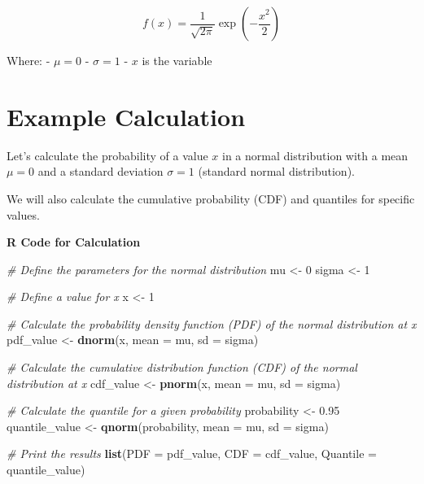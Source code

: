 \documentclass[
]{book}
\newenvironment{Shaded}{\begin{snugshade}}{\end{snugshade}}
\newcommand{\AttributeTok}[1]{\textcolor[rgb]{0.13,0.29,0.53}{#1}}
\newcommand{\CommentTok}[1]{\textcolor[rgb]{0.56,0.35,0.01}{\textit{#1}}}
\newcommand{\DecValTok}[1]{\textcolor[rgb]{0.00,0.00,0.81}{#1}}
\newcommand{\FloatTok}[1]{\textcolor[rgb]{0.00,0.00,0.81}{#1}}
\newcommand{\FunctionTok}[1]{\textcolor[rgb]{0.13,0.29,0.53}{\textbf{#1}}}
\newcommand{\NormalTok}[1]{#1}
\newcommand{\OtherTok}[1]{\textcolor[rgb]{0.56,0.35,0.01}{#1}}
\begin{document}
\[
f(x) = \frac{1}{\sqrt{2\pi}} \exp\left(-\frac{x^2}{2}\right)
\]

Where:
- \(\mu = 0\)
- \(\sigma = 1\)
- \(x\) is the variable

\hypertarget{example-calculation-1}{%
\section{Example Calculation}\label{example-calculation-1}}

Let's calculate the probability of a value \(x\) in a normal distribution with a mean \(\mu = 0\) and a standard deviation \(\sigma = 1\) (standard normal distribution).

We will also calculate the cumulative probability (CDF) and quantiles for specific values.

\textbf{R Code for Calculation}

\begin{Shaded}
\begin{Highlighting}[]
\CommentTok{\# Define the parameters for the normal distribution}
\NormalTok{mu }\OtherTok{\textless{}{-}} \DecValTok{0}
\NormalTok{sigma }\OtherTok{\textless{}{-}} \DecValTok{1}

\CommentTok{\# Define a value for x}
\NormalTok{x }\OtherTok{\textless{}{-}} \DecValTok{1}

\CommentTok{\# Calculate the probability density function (PDF) of the normal distribution at x}
\NormalTok{pdf\_value }\OtherTok{\textless{}{-}} \FunctionTok{dnorm}\NormalTok{(x, }\AttributeTok{mean =}\NormalTok{ mu, }\AttributeTok{sd =}\NormalTok{ sigma)}

\CommentTok{\# Calculate the cumulative distribution function (CDF) of the normal distribution at x}
\NormalTok{cdf\_value }\OtherTok{\textless{}{-}} \FunctionTok{pnorm}\NormalTok{(x, }\AttributeTok{mean =}\NormalTok{ mu, }\AttributeTok{sd =}\NormalTok{ sigma)}

\CommentTok{\# Calculate the quantile for a given probability}
\NormalTok{probability }\OtherTok{\textless{}{-}} \FloatTok{0.95}
\NormalTok{quantile\_value }\OtherTok{\textless{}{-}} \FunctionTok{qnorm}\NormalTok{(probability, }\AttributeTok{mean =}\NormalTok{ mu, }\AttributeTok{sd =}\NormalTok{ sigma)}

\CommentTok{\# Print the results}
\FunctionTok{list}\NormalTok{(}\AttributeTok{PDF =}\NormalTok{ pdf\_value, }\AttributeTok{CDF =}\NormalTok{ cdf\_value, }\AttributeTok{Quantile =}\NormalTok{ quantile\_value)}
\end{Highlighting}
\end{Shaded}
\end{document}
